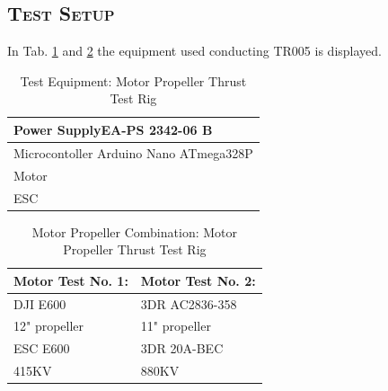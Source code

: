 \subsection*{\textsc{\medium Test Setup}}
In Tab. \ref{tab:tabt6} and \ref{tab:tabt7} the equipment used conducting TR005 is displayed.
\begin {table}[H]
    \begin{center}
    \caption {Test Equipment: Motor Propeller Thrust Test Rig} 
    \label{tab:tabt6} 
    \begin{tabular}{|l|}\hline 
        Power SupplyEA-PS 2342-06 B           \\ \hline
        Microcontoller Arduino Nano ATmega328P \\ \hline
        Motor \\ \hline
        ESC\\ \hline    
        \end{tabular}
    \end{center}
\end{table}

\begin {table}[H]
    \begin{center}
    \caption {Motor Propeller Combination: Motor Propeller Thrust Test Rig} 
    \label{tab:tabt7} 
    \begin{tabular}{|l|l|}\hline 
        Motor Test No. 1: & Motor Test No. 2:    \\ \hline
        DJI E600 & 3DR AC2836-358   \\ \hline
        12" propeller & 11" propeller \\ \hline
        ESC E600 & 3DR 20A-BEC\\ \hline
        415KV & 880KV\\ \hline
        \end{tabular}
    \end{center}
\end{table}\newpage
\newpage

